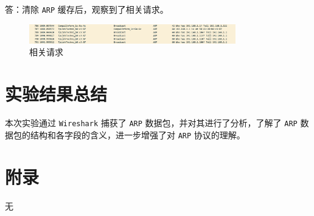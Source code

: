 \documentclass{article}
\begin{document}
\begin{enumerate}[noitemsep]
答：清除 \texttt{ARP} 缓存后，观察到了相关请求。

\begin{figure}[H]
  \centering
  \includegraphics[width=0.8\textwidth]{img/12.png}
  \caption{相关请求}
  \label{fig:12}
\end{figure}

\end{enumerate}


\section{实验结果总结}

本次实验通过 \texttt{Wireshark} 捕获了 \texttt{ARP} 数据包，并对其进行了分析，了解了 \texttt{ARP} 数据包的结构和各字段的含义，进一步增强了对 \texttt{ARP} 协议的理解。


\section{附录}

无
\end{document}
